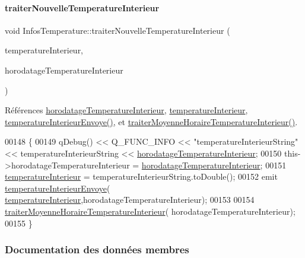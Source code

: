 \paragraph{\texorpdfstring{traiter\+Nouvelle\+Temperature\+Interieur}{traiterNouvelleTemperatureInterieur}}
{\footnotesize\ttfamily void Infos\+Temperature\+::traiter\+Nouvelle\+Temperature\+Interieur (\begin{DoxyParamCaption}\item[{Q\+String}]{temperature\+Interieur,  }\item[{Q\+String}]{horodatage\+Temperature\+Interieur }\end{DoxyParamCaption})\hspace{0.3cm}{\ttfamily [slot]}}



Références \hyperlink{class_infos_temperature_ad4c62d479b8897102a59025a56d7b4c6}{horodatage\+Temperature\+Interieur}, \hyperlink{class_infos_temperature_a976ab7ead7ac82b5b8572807d778689e}{temperature\+Interieur}, \hyperlink{class_infos_temperature_acaff5cc6bedc53a8bf2c914957d2ab47}{temperature\+Interieur\+Envoye()}, et \hyperlink{class_infos_temperature_a0311c8ce5730388f3baef752920d5abf}{traiter\+Moyenne\+Horaire\+Temperature\+Interieur()}.


\begin{DoxyCode}
00148 \{
00149     qDebug() << Q\_FUNC\_INFO << \textcolor{stringliteral}{"temperatureInterieurString"} << temperatureInterieurString << 
      \hyperlink{class_infos_temperature_ad4c62d479b8897102a59025a56d7b4c6}{horodatageTemperatureInterieur};
00150     this->horodatageTemperatureInterieur = \hyperlink{class_infos_temperature_ad4c62d479b8897102a59025a56d7b4c6}{horodatageTemperatureInterieur};
00151     \hyperlink{class_infos_temperature_a976ab7ead7ac82b5b8572807d778689e}{temperatureInterieur} = temperatureInterieurString.toDouble();    
00152     emit \hyperlink{class_infos_temperature_acaff5cc6bedc53a8bf2c914957d2ab47}{temperatureInterieurEnvoye}(
      \hyperlink{class_infos_temperature_a976ab7ead7ac82b5b8572807d778689e}{temperatureInterieur},horodatageTemperatureInterieur);
00153 
00154     \hyperlink{class_infos_temperature_a0311c8ce5730388f3baef752920d5abf}{traiterMoyenneHoraireTemperatureInterieur}(
      horodatageTemperatureInterieur);
00155 \}
\end{DoxyCode}


\subsubsection{Documentation des données membres}
\mbox{\label{class_infos_temperature_a44edcf244175896e28798f252900f774}} 
